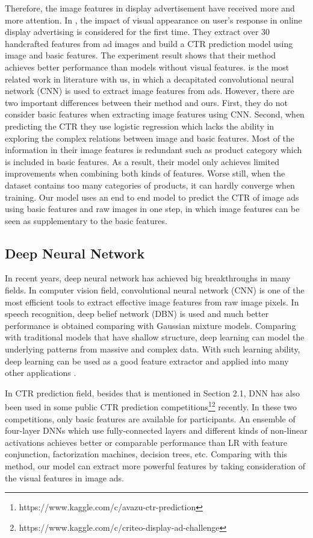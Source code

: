 \documentclass{sig-alternate}
\begin{document}
Therefore, the image features in display advertisement have received more and more attention. In \cite{azimi2012impact,cheng2012multimedia}, the impact of  visual appearance  on user's response in online display advertising is considered for the first time. They extract over 30 handcrafted features from ad images and build a CTR prediction model using image and basic  features. The experiment result shows that their method achieves better performance than models without visual features.   \cite{Mo:2015:IFL:2832747.2832769} is the most related work  in literature with us, in which a decapitated convolutional neural network (CNN) is used to extract image features from ads. However, there are two important differences between their method and ours.   First, they do not consider basic features when extracting image features using CNN. Second,  when predicting the CTR they  use logistic regression which lacks the ability in exploring the complex relations between image and basic features. Most of the information in their image features is redundant  such as product category which is included in basic features. As a result, their model only achieves limited improvements when combining both kinds of features. Worse still, when the dataset contains too many categories of products, it can hardly converge when training. Our model uses an end to end model to predict the CTR of image ads using basic features and raw images in one step, in which image features can be seen as  supplementary to the basic features.
\subsection{Deep Neural Network} 
In recent years, deep neural network has achieved big breakthroughs in many fields. In computer vision field, convolutional neural network (CNN) \cite{NIPS2012_4824} is one of the most efficient tools to extract effective image features from raw image pixels.  In speech recognition, deep belief network (DBN) \cite{hinton2012deep} is used and much better performance is obtained comparing with Gaussian mixture models. Comparing with traditional models that have shallow structure, deep learning can model the underlying patterns  from massive and complex data. With such learning ability, deep learning can be used as a good feature extractor and applied into many other applications \cite{ren2015faster,simonyan2014two}.

In CTR prediction field, besides \cite{zhang2016deep} that is mentioned in Section 2.1, DNN has also been used in some public CTR prediction  competitions\footnote{https://www.kaggle.com/c/avazu-ctr-prediction}\footnote{https://www.kaggle.com/c/criteo-display-ad-challenge} recently. In these two competitions, only basic features are available for participants. An ensemble of four-layer DNNs which use fully-connected layers and different kinds of non-linear activations  achieves better or comparable performance than LR with feature conjunction, factorization machines, decision trees, etc. Comparing with this method, our model can extract more powerful features by taking consideration  of the visual features in image ads. 
\end{document}
